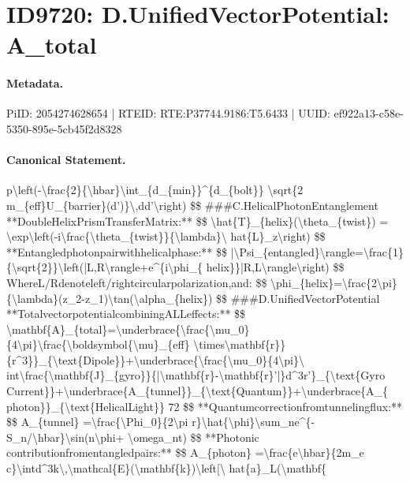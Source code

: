 \section*{ID9720: D.UnifiedVectorPotential: A\_total}
\paragraph{Metadata.}
PiID: 2054274628654 | RTEID: RTE:P37744.9186:T5.6433 | UUID: ef922a13-c58e-5350-895e-5cb45f2d8328

\paragraph{Canonical Statement.}
p\textbackslash{}left(-\textbackslash{}frac\{2\}\{\textbackslash{}hbar\}\textbackslash{}int\_\{d\_\{min\}\}\textasciicircum{}\{d\_\{bolt\}\} \textbackslash{}sqrt\{2 m\_\{eff\}U\_\{barrier\}(d’)\}\textbackslash{},dd’\textbackslash{}right) \$\$ \#\#\#C.HelicalPhotonEntanglement **DoubleHelixPrismTransferMatrix:** \$\$ \textbackslash{}hat\{T\}\_\{helix\}(\textbackslash{}theta\_\{twist\}) = \textbackslash{}exp\textbackslash{}left(-i\textbackslash{}frac\{\textbackslash{}theta\_\{twist\}\}\{\textbackslash{}lambda\}\textbackslash{} hat\{L\}\_z\textbackslash{}right) \$\$ **Entangledphotonpairwithhelicalphase:** \$\$ |\textbackslash{}Psi\_\{entangled\}\textbackslash{}rangle=\textbackslash{}frac\{1\}\{\textbackslash{}sqrt\{2\}\}\textbackslash{}left(|L,R\textbackslash{}rangle+e\textasciicircum{}\{i\textbackslash{}phi\_\{ helix\}\}|R,L\textbackslash{}rangle\textbackslash{}right) \$\$ WhereL/Rdenoteleft/rightcircularpolarization,and: \$\$ \textbackslash{}phi\_\{helix\}=\textbackslash{}frac\{2\textbackslash{}pi\}\{\textbackslash{}lambda\}(z\_2-z\_1)\textbackslash{}tan(\textbackslash{}alpha\_\{helix\}) \$\$ \#\#\#D.UnifiedVectorPotential **TotalvectorpotentialcombiningALLeffects:** \$\$ \textbackslash{}mathbf\{A\}\_\{total\}=\textbackslash{}underbrace\{\textbackslash{}frac\{\textbackslash{}mu\_0\}\{4\textbackslash{}pi\}\textbackslash{}frac\{\textbackslash{}boldsymbol\{\textbackslash{}mu\}\_\{eff\} \textbackslash{}times\textbackslash{}mathbf\{r\}\}\{r\textasciicircum{}3\}\}\_\{\textbackslash{}text\{Dipole\}\}+\textbackslash{}underbrace\{\textbackslash{}frac\{\textbackslash{}mu\_0\}\{4\textbackslash{}pi\}\textbackslash{} int\textbackslash{}frac\{\textbackslash{}mathbf\{J\}\_\{gyro\}\}\{|\textbackslash{}mathbf\{r\}-\textbackslash{}mathbf\{r\}’|\}d\textasciicircum{}3r’\}\_\{\textbackslash{}text\{Gyro Current\}\}+\textbackslash{}underbrace\{A\_\{tunnel\}\}\_\{\textbackslash{}text\{Quantum\}\}+\textbackslash{}underbrace\{A\_\{ photon\}\}\_\{\textbackslash{}text\{HelicalLight\}\} 72 \$\$ **Quantumcorrectionfromtunnelingflux:** \$\$ A\_\{tunnel\} =\textbackslash{}frac\{\textbackslash{}Phi\_0\}\{2\textbackslash{}pi r\}\textbackslash{}hat\{\textbackslash{}phi\}\textbackslash{}sum\_ne\textasciicircum{}\{-S\_n/\textbackslash{}hbar\}\textbackslash{}sin(n\textbackslash{}phi+ \textbackslash{}omega\_nt) \$\$ **Photonic contributionfromentangledpairs:** \$\$ A\_\{photon\} =\textbackslash{}frac\{e\textbackslash{}hbar\}\{2m\_e c\}\textbackslash{}intd\textasciicircum{}3k\textbackslash{},\textbackslash{}mathcal\{E\}(\textbackslash{}mathbf\{k\})\textbackslash{}left[\textbackslash{} hat\{a\}\_L(\textbackslash{}mathbf\{

